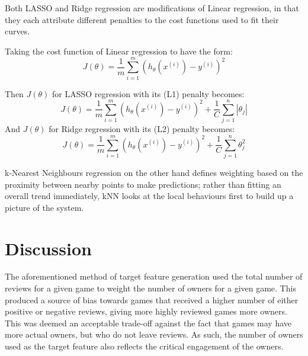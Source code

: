 Both LASSO and Ridge regression are modifications of Linear regression, in that they each attribute different penalties to the cost functions used to fit their curves.

Taking the cost function of Linear regression to have the form:
\[
J(\theta) = \frac{1}{m} \sum_{i=1}^m (h_{\theta}(x^{(i)}) - y^{(i)})^2
\]

Then $J(\theta)$ for LASSO regression with its (L1) penalty becomes:
\[
J(\theta) = \frac{1}{m} \sum_{i=1}^m (h_{\theta}(x^{(i)}) - y^{(i)})^2 + \frac{1}{C} \sum_{j=1}^n |\theta_j|
\]
And $J(\theta)$ for Ridge regression with its (L2) penalty becomes:
\[
J(\theta) = \frac{1}{m} \sum_{i=1}^m (h_{\theta}(x^{(i)}) - y^{(i)})^2 + \frac{1}{C} \sum_{j=1}^n \theta_j^2
\]

k-Nearest Neighbours regression on the other hand defines weighting based on the proximity between nearby points to make predictions; rather than fitting an overall trend immediately, kNN looks at the local behaviours first to build up a picture of the system.

\section{Discussion}


The aforementioned method of target feature generation used the total number of reviews for a given game to weight the number of owners for a given game. This produced a source of bias towards games that received a higher number of either positive or negative reviews, giving more highly reviewed games more owners. This was deemed an acceptable trade-off against the fact that games may have more actual owners, but who do not leave reviews. As such, the number of owners used as the target feature also reflects the critical engagement of the owners.